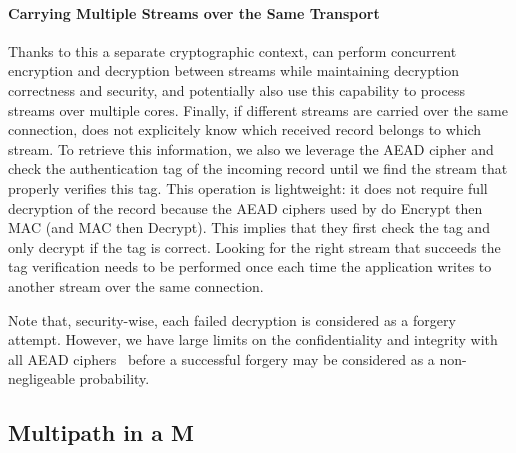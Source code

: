 \paragraph*{Carrying Multiple Streams over the Same Transport}
Thanks to this a separate cryptographic context, \tcpls can perform concurrent
encryption and decryption between streams while maintaining decryption
correctness and security, and potentially also use this capability to process
streams over multiple cores. Finally, if different streams are carried
over the same \tcp connection, \tcpls does not explicitely know which
received record belongs to which stream. To retrieve this information,
we also we
leverage the AEAD cipher and check the authentication tag of the
incoming record until we find the stream that properly verifies this tag. This
operation is lightweight: it does not require full decryption of the record
because the AEAD ciphers used by  do Encrypt then MAC (and MAC then
Decrypt). This implies that they first check the tag and only decrypt
if the tag is correct. Looking for the right stream that succeeds
the tag verification needs to be
performed once each time the application writes to another stream over the same
\tcp connection.

Note that, security-wise, each failed decryption is considered as a
forgery attempt. However, we have large limits on the confidentiality and
integrity with all AEAD ciphers~\cite{luykx2015limits, aeadlimits} before a
successful forgery may be considered as a non-negligeable probability.




\subsection{Multipath in a M}
\label{sec:multipath}

